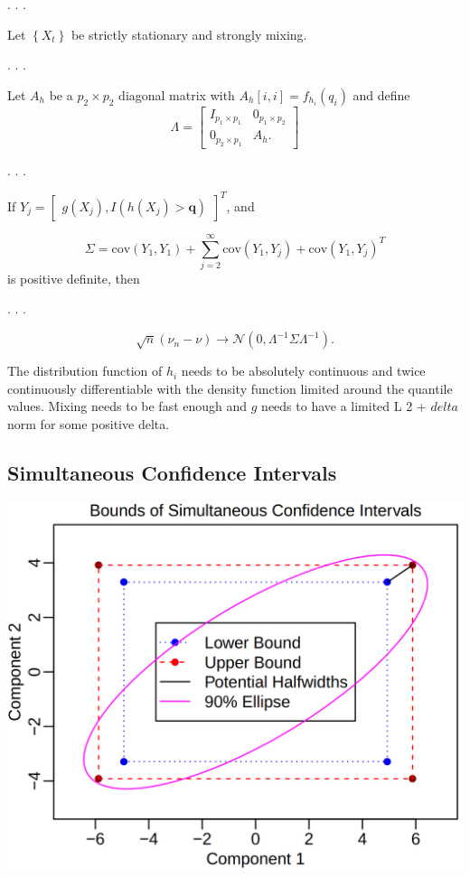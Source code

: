 \documentclass[
  letterpaper,
  DIV=11,
  numbers=noendperiod]{scrartcl}
\begin{document}
. . .

Let \(\left\lbrace X_t \right\rbrace\) be strictly stationary and
strongly mixing.

. . .

Let \(A_h\) be a \(p_2 \times p_2\) diagonal matrix with
\(A_{h}[i,i] = f_{h_i}(q_i)\) and define \[
\Lambda = \begin{bmatrix} I_{p_1 \times p_1} & 0_{p_1 \times p_2}\\ 0_{p_2 \times p_1} & A_h. \end{bmatrix}
\]

. . .

If
\(Y_j = \begin{bmatrix} g(X_j), I(h(X_j) > \mathbf q)\end{bmatrix}^T\),
and

\[ \Sigma = \text{cov}\left(Y_1, Y_1\right) + \sum_{j=2}^\infty\text{cov}\left(Y_1, Y_j\right) + \text{cov}\left(Y_1, Y_j\right)^T\]
is positive definite, then

. . .

\[\sqrt n (\hat\nu_n - \nu) \to \mathcal N(0, \Lambda^{-1}\Sigma\Lambda^{-1}).\]

The distribution function of \(h_i\) needs to be absolutely continuous
and twice continuously differentiable with the density function limited
around the quantile values. Mixing needs to be fast enough and \(g\)
needs to have a limited L 2 + \(delta\) norm for some positive delta.

\hypertarget{simultaneous-confidence-intervals}{%
\subsection{Simultaneous Confidence
Intervals}\label{simultaneous-confidence-intervals}}

\includegraphics{ellipse.png}
\end{document}
